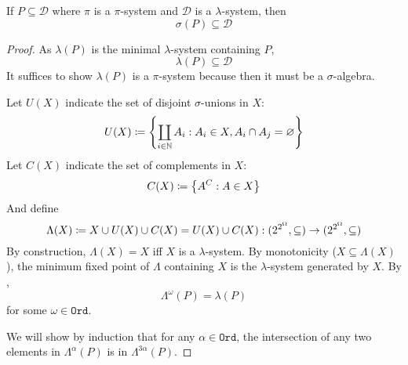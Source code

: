 \documentclass{scrartcl}
\newcommand{\measpace}{\Omega}
\newcommand{\system}{\mathcal D}
\DeclareMathOperator*{\bigdisjunion}{\coprod}
\newcommand{\ordinals}{\texttt{Ord}}
\newcommand{\inclass}{\in}
\begin{document}
\newcommand{\lambdify}{\Lambda}
\newcommand{\lambdagen}{\lambda}
\newcommand{\pisystem}{P}
\newcommand{\dsystem}{\system}
\begin{theorem}
  If \(\pisystem\subseteq \dsystem\) where \(\pi\) is a \(\pi\)-system and \(\dsystem\) is a
  \(\lambda\)-system, then
  \[
    \sigma(\pisystem) \subseteq \dsystem
  \]
\end{theorem}
\begin{proof}
  As \(\lambdagen(\pisystem)\) is the minimal \(\lambda\)-system containing
  \(\pisystem\),
  \[
    \lambdagen(\pisystem)\subseteq\dsystem
  \]
  It suffices to show \(\lambdagen(\pisystem)\) is a
  \(\pi\)-system because then it must be a \(\sigma\)-algebra.

  Let \(U(X)\) indicate the set of disjoint \(\sigma\)-unions in \(X\):
  \[
    U(X)\define\left\{\bigdisjunion_{i\in \N} A_i: A_i\in X, A_i\cap A_j=\emptyset\right\}
  \]
  Let \(C(X)\) indicate the set of complements in \(X\):
  \[
    C(X)\coloneqq\left\{ A^C:A\in X \right\}
  \]
  And define
  \[
    \lambdify(X)\define X\cup U(X) \cup C(X) = U(X)\cup C(X) :
    (2^{2^\measpace},\subseteq ) \to (2^{2^\measpace},\subseteq)
  \]
  By construction, \(\lambdify(X)=X\) iff \(X\) is a \(\lambda\)-system. By monotonicity
  (\(X\subseteq\lambdify(X)\)), the minimum fixed point of \(\lambdify\) containing \(X\)
  is the \(\lambda\)-system generated by \(X\). By ,
  \newcommand{\stopord}{\omega}
  \[
    \lambdify^\stopord(\pisystem)=\lambda(\pisystem)
  \]
  for some \(\stopord\inclass\ordinals\).

  We will show by induction that for any \(\alpha\in\ordinals\), the intersection of
  any two elements in \(\lambdify^\alpha(\pisystem)\) is in
  \(\lambdify^{3\alpha}(\pisystem)\).


\end{proof}
\end{document}
